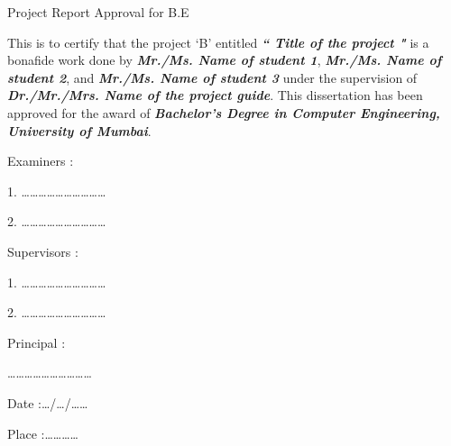 \begin{center}
\huge Project Report Approval for B.E
\end{center}
\vspace{0.5in}

This is to certify that the project `B' entitled \textbf{\textit{`` Title of the project "}} is a bonafide work done by \textbf{\textit{Mr./Ms. Name of student 1}}, \textbf{\textit{Mr./Ms. Name of student 2}}, and \textbf{\textit{Mr./Ms. Name of student 3}} under the supervision of \textbf{\textit{Dr./Mr./Mrs. Name of the project guide}}. This dissertation has been approved for the award of \textbf{\textit{Bachelor's Degree in Computer Engineering, University of Mumbai}}.


\vspace{1in}

{\centering Examiners :

\hspace{10cm}1. \ldots\ldots\ldots\ldots\ldots\ldots\ldots\ldots\ldots\ldots

\vspace{0.3in}

\hspace{10cm}2. \ldots\ldots\ldots\ldots\ldots\ldots\ldots\ldots\ldots\ldots

\vspace{0.5in}

Supervisors :

\hspace{10cm}1. \ldots\ldots\ldots\ldots\ldots\ldots\ldots\ldots\ldots\ldots

\vspace{0.3in}

\hspace{10cm}2. \ldots\ldots\ldots\ldots\ldots\ldots\ldots\ldots\ldots\ldots

\vspace{0.5in}

Principal :

\hspace{10cm}   \ldots\ldots\ldots\ldots\ldots\ldots\ldots\ldots\ldots\ldots }

\vspace{0.5in}

\begin{flushleft}
Date :\hspace{0.2cm}\ldots/\ldots/\ldots\ldots

\vspace{0.2in}

Place :\hspace{0.2cm}\ldots\ldots\ldots\ldots

\end{flushleft}



